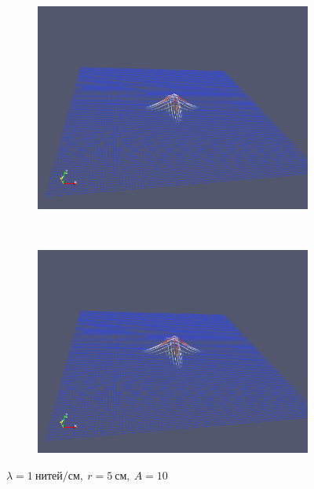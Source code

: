 \begin{figure}[H]
\begin{subfigure}[t]{0.5\textwidth}
        \includegraphics[width=\textwidth]{img/fiber/density_1_radius_5_amplitude_10/5.png}
    \end{subfigure}%
    ~
    \begin{subfigure}[t]{0.5\textwidth}
        \centering
        \includegraphics[width=\textwidth]{img/fiber/density_1_radius_5_amplitude_10/6.png}
    \end{subfigure}
    \caption{$\lambda=1~нитей/см,~r=5~см,~A=10$}
\end{figure}
